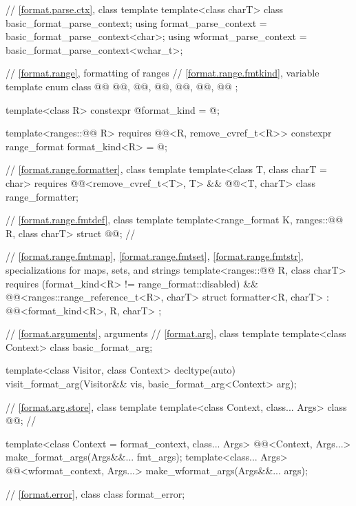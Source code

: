 \begin{codeblock}
{  // \ref{format.parse.ctx}, class template 
  template<class charT> class basic_format_parse_context;
  using format_parse_context = basic_format_parse_context<char>;
  using wformat_parse_context = basic_format_parse_context<wchar_t>;

  // \ref{format.range}, formatting of ranges
  // \ref{format.range.fmtkind}, variable template 
  enum class @@ {
    @@,
    @@,
    @@,
    @@,
    @@,
    @@
  };

  template<class R>
    constexpr @\unspec@ format_kind = @\unspec@;

  template<ranges::@@ R>
      requires @@<R, remove_cvref_t<R>>
    constexpr range_format format_kind<R> = @\seebelow@;

  // \ref{format.range.formatter}, class template 
  template<class T, class charT = char>
    requires @@<remove_cvref_t<T>, T> && @@<T, charT>
  class range_formatter;

  // \ref{format.range.fmtdef}, class template 
  template<range_format K, ranges::@@ R, class charT>
    struct @@;                                     // \expos

  // \ref{format.range.fmtmap}, \ref{format.range.fmtset}, \ref{format.range.fmtstr}, specializations for maps, sets, and strings
  template<ranges::@@ R, class charT>
    requires (format_kind<R> != range_format::disabled) &&
             @@<ranges::range_reference_t<R>, charT>
  struct formatter<R, charT> : @@<format_kind<R>, R, charT> { };

  // \ref{format.arguments}, arguments
  // \ref{format.arg}, class template 
  template<class Context> class basic_format_arg;

  template<class Visitor, class Context>
    decltype(auto) visit_format_arg(Visitor&& vis, basic_format_arg<Context> arg);

  // \ref{format.arg.store}, class template 
  template<class Context, class... Args> class @@;        // \expos

  template<class Context = format_context, class... Args>
    @@<Context, Args...>
      make_format_args(Args&&... fmt_args);
  template<class... Args>
    @@<wformat_context, Args...>
      make_wformat_args(Args&&... args);

  // \ref{format.error}, class 
  class format_error;
}
\end{codeblock}



